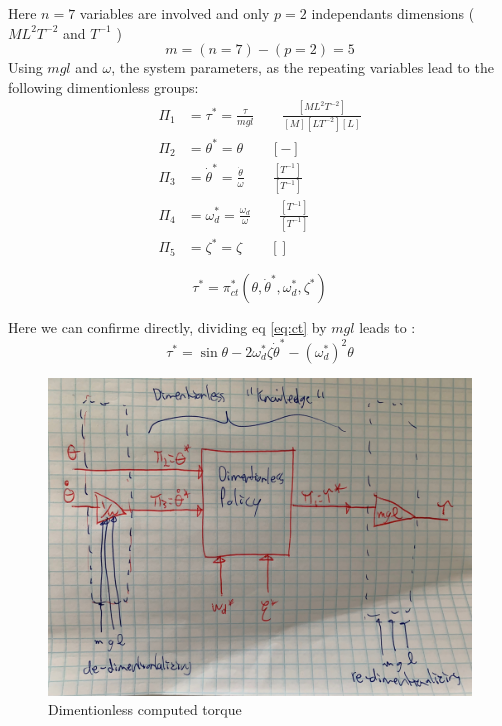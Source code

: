 Here $n=7$ variables are involved and only $p=2$ independants dimensions ( $ML^2T^{-2}$ and $T^{-1}$ )
\begin{equation}
m = (n = 7 ) - ( p = 2 ) = 5
\end{equation}
Using $mgl$ and $\omega$, the system parameters, as the repeating variables lead to the following dimentionless groups:
\begin{align}
\Pi_1 &= \tau^* = \frac{\tau}{mgl} \quad \quad \frac{[ML^2T^{-2}]}{[M][LT^{-2}][L]} \\
\Pi_2 &= \theta^* = \theta \quad \quad [-]\\
\Pi_3 &= \dot{\theta}^* = \frac{ \dot{\theta}  }{ \omega } \quad \quad \frac{[T^{-1}]}{[T^{-1}]} \\
\Pi_4 &= \omega_d^* = \frac{\omega_d}{\omega} \quad \quad \frac{[T^{-1}]}{[T^{-1}]} \\
\Pi_5 &= \zeta^* = \zeta \quad \quad []
\end{align}



\begin{equation}
\tau^*
=
\pi^*_{ct} \left(
\theta, \dot{\theta}^*,
\omega_d^* , \zeta^* 
\right)
\end{equation}

Here we can confirme directly, dividing eq \eqref{eq:ct} by $mgl$ leads to :
\begin{equation}
\tau^*
=
\sin \theta
- 2 \omega_d^* \zeta \dot{\theta}^* 
- (\omega_d^*)^2 \theta
\end{equation}

\begin{figure}[H]
\begin{center}
\includegraphics[width=0.99\linewidth]{fig/ct.JPG}
\caption{Dimentionless computed torque}\label{fig:ct}
\end{center}
\end{figure}




